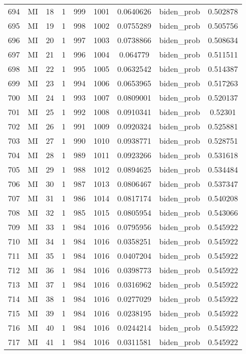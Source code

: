 \documentclass[12pt,a4paper]{article}
\begin{document}
\begin{tabular}{r|cccccccc}
	694 & MI & 18 & 1 & 999 & 1001 & 0.0640626 & biden\_prob & 0.502878 \\
	695 & MI & 19 & 1 & 998 & 1002 & 0.0755289 & biden\_prob & 0.505756 \\
	696 & MI & 20 & 1 & 997 & 1003 & 0.0738866 & biden\_prob & 0.508634 \\
	697 & MI & 21 & 1 & 996 & 1004 & 0.064779 & biden\_prob & 0.511511 \\
	698 & MI & 22 & 1 & 995 & 1005 & 0.0632542 & biden\_prob & 0.514387 \\
	699 & MI & 23 & 1 & 994 & 1006 & 0.0653965 & biden\_prob & 0.517263 \\
	700 & MI & 24 & 1 & 993 & 1007 & 0.0809001 & biden\_prob & 0.520137 \\
	701 & MI & 25 & 1 & 992 & 1008 & 0.0910341 & biden\_prob & 0.52301 \\
	702 & MI & 26 & 1 & 991 & 1009 & 0.0920324 & biden\_prob & 0.525881 \\
	703 & MI & 27 & 1 & 990 & 1010 & 0.0938771 & biden\_prob & 0.528751 \\
	704 & MI & 28 & 1 & 989 & 1011 & 0.0923266 & biden\_prob & 0.531618 \\
	705 & MI & 29 & 1 & 988 & 1012 & 0.0894625 & biden\_prob & 0.534484 \\
	706 & MI & 30 & 1 & 987 & 1013 & 0.0806467 & biden\_prob & 0.537347 \\
	707 & MI & 31 & 1 & 986 & 1014 & 0.0817174 & biden\_prob & 0.540208 \\
	708 & MI & 32 & 1 & 985 & 1015 & 0.0805954 & biden\_prob & 0.543066 \\
	709 & MI & 33 & 1 & 984 & 1016 & 0.0795956 & biden\_prob & 0.545922 \\
	710 & MI & 34 & 1 & 984 & 1016 & 0.0358251 & biden\_prob & 0.545922 \\
	711 & MI & 35 & 1 & 984 & 1016 & 0.0407204 & biden\_prob & 0.545922 \\
	712 & MI & 36 & 1 & 984 & 1016 & 0.0398773 & biden\_prob & 0.545922 \\
	713 & MI & 37 & 1 & 984 & 1016 & 0.0316962 & biden\_prob & 0.545922 \\
	714 & MI & 38 & 1 & 984 & 1016 & 0.0277029 & biden\_prob & 0.545922 \\
	715 & MI & 39 & 1 & 984 & 1016 & 0.0238195 & biden\_prob & 0.545922 \\
	716 & MI & 40 & 1 & 984 & 1016 & 0.0244214 & biden\_prob & 0.545922 \\
	717 & MI & 41 & 1 & 984 & 1016 & 0.0311581 & biden\_prob & 0.545922 \\

\end{tabular}
\end{document}
